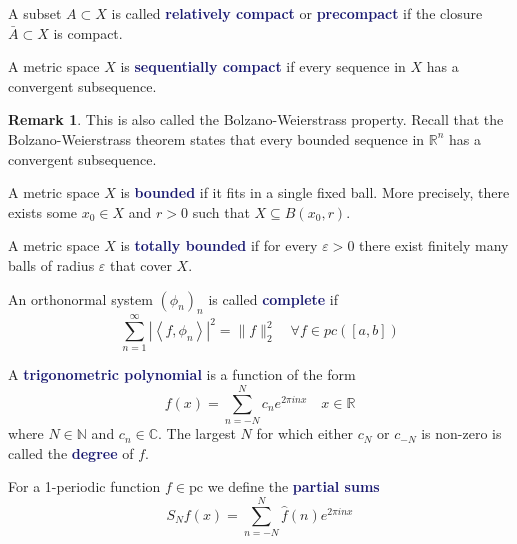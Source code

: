 \documentclass[11pt]{article}
\numberwithin{equation}{section}
\newcommand{\navy}[1]{\textcolor{MidnightBlue}{\bf #1}}
\theoremstyle{definition}
\theoremstyle{definition}
\newtheorem*{remark}{Remark}
\newcommand\angles[1]{\left\langle #1 \right\rangle}
\newcommand\abs[1]{\left| #1 \right|}
\newcommand\norm[1]{\lVert#1\rVert}
\def\ss{\subset}
\newcommand{\1}{\mathbbm 1}
\newcommand{\e}{\varepsilon}
\newcommand{\CC}{\mathbb C}
\newcommand{\RR}{\mathbb R}
\newcommand{\NN}{\mathbb N}
\begin{document}
\begin{definition}
A subset $A \ss X$ is called \navy{relatively compact} or \navy{precompact} if the closure $\bar{A} \ss X$ is compact.
\end{definition}

\begin{definition}
A metric space $X$ is \navy{sequentially compact} if every sequence in $X$ has a convergent subsequence.
\begin{remark}
This is also called the Bolzano-Weierstrass property. Recall that the Bolzano-Weierstrass theorem states that every bounded sequence in $\RR^n$ has a convergent subsequence.
\end{remark}
\end{definition}

\begin{definition}
A metric space $X$ is \navy{bounded} if it fits in a single fixed ball. More precisely, there exists some $x_0 \in X$ and $r > 0$ such that $X \subseteq B(x_0,r)$.
\end{definition}

\begin{definition}
A metric space $X$ is \navy{totally bounded} if for every $\e > 0$ there exist finitely many balls of radius $\e$ that cover $X$.
\end{definition}

\begin{definition}
An orthonormal system $(\phi_n)_n$ is called \navy{complete} if
\begin{equation}
\sum_{n=1}^\infty \abs{\angles{f,\phi_n}}^2 = \norm{f}^2_2 \quad \forall f \in pc([a,b])
\end{equation}
\end{definition}

\begin{definition}
A \navy{trigonometric polynomial} is a function of the form
\begin{equation}
f(x) = \sum_{n=-N}^N c_n e^{2\pi i n x} \quad x \in \RR
\end{equation}
where $N \in \NN$ and $c_n \in \CC$. The largest $N$ for which either $c_N$ or $c_{-N}$ is non-zero is called the \navy{degree} of $f$.
\end{definition}

\begin{definition}
For a 1-periodic function $f \in \text{pc}$ we define the \navy{partial sums}
\begin{equation}
S_Nf(x) = \sum_{n=-N}^N \hat{f}(n) e^{2\pi i nx}
\end{equation}
\end{definition}
\end{document}
